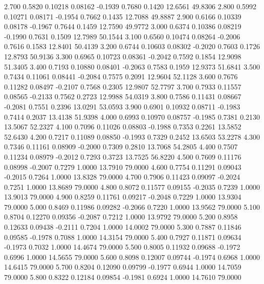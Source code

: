    2.700   0.5820   0.10218   0.08162  -0.1939   0.7680   0.1420  12.6561  49.8306
   2.800   0.5992   0.10271   0.08171  -0.1954   0.7662   0.1435  12.7088  49.8887
   2.900   0.6166   0.10339   0.08178  -0.1967   0.7644   0.1459  12.7590  49.9772
   3.000   0.6374   0.10386   0.08219  -0.1990   0.7631   0.1509  12.7989  50.1544
   3.100   0.6560   0.10474   0.08264  -0.2006   0.7616   0.1583  12.8401  50.4139
   3.200   0.6744   0.10603   0.08302  -0.2020   0.7603   0.1726  12.8793  50.9136
   3.300   0.6965   0.10723   0.08361  -0.2042   0.7592   0.1854  12.9098  51.3405
   3.400   0.7193   0.10880   0.08401  -0.2063   0.7583   0.1959  12.9373  51.6841
   3.500   0.7434   0.11061   0.08441  -0.2084   0.7575   0.2091  12.9604  52.1128
   3.600   0.7676   0.11282   0.08497  -0.2107   0.7568   0.2305  12.9807  52.7797
   3.700   0.7933   0.11557   0.08565  -0.2133   0.7562   0.2723  12.9988  54.0319
   3.800   0.7586   0.11431   0.08667  -0.2081   0.7551   0.2396  13.0291  53.0593
   3.900   0.6901   0.10932   0.08711  -0.1983   0.7414   0.2037  13.4138  51.9398
   4.000   0.6993   0.10970   0.08757  -0.1985   0.7381   0.2130  13.5067  52.2327
   4.100   0.7096   0.11026   0.08803  -0.1988   0.7353   0.2261  13.5852  52.6430
   4.200   0.7217   0.11089   0.08850  -0.1993   0.7329   0.2452  13.6503  53.2278
   4.300   0.7346   0.11161   0.08909  -0.2000   0.7309   0.2810  13.7068  54.2805
   4.400   0.7507   0.11234   0.08979  -0.2012   0.7293   0.3723  13.7525  56.8220
   4.500   0.7609   0.11176   0.08998  -0.2007   0.7279   1.0000  13.7910  79.0000
   4.600   0.7754   0.11291   0.09043  -0.2015   0.7264   1.0000  13.8328  79.0000
   4.700   0.7906   0.11423   0.09097  -0.2024   0.7251   1.0000  13.8689  79.0000
   4.800   0.8072   0.11577   0.09155  -0.2035   0.7239   1.0000  13.9013  79.0000
   4.900   0.8259   0.11761   0.09217  -0.2048   0.7229   1.0000  13.9304  79.0000
   5.000   0.8469   0.11986   0.09282  -0.2066   0.7220   1.0000  13.9562  79.0000
   5.100   0.8704   0.12270   0.09356  -0.2087   0.7212   1.0000  13.9792  79.0000
   5.200   0.8958   0.12633   0.09438  -0.2111   0.7204   1.0000  14.0002  79.0000
   5.300   0.7887   0.11846   0.09585  -0.1978   0.7088   1.0000  14.3154  79.0000
   5.400   0.7927   0.11871   0.09634  -0.1973   0.7032   1.0000  14.4674  79.0000
   5.500   0.8005   0.11932   0.09688  -0.1972   0.6996   1.0000  14.5655  79.0000
   5.600   0.8098   0.12007   0.09744  -0.1974   0.6968   1.0000  14.6415  79.0000
   5.700   0.8204   0.12090   0.09799  -0.1977   0.6944   1.0000  14.7059  79.0000
   5.800   0.8322   0.12184   0.09854  -0.1981   0.6924   1.0000  14.7610  79.0000
